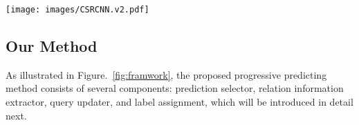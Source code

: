 \documentclass[final]{cvpr}
\begin{document}
\begin{figure*}[htbp]
  \centering
  \texttt{[image: images/CSRCNN.v2.pdf]}
\caption{The diagram of the proposed progressive end-to-end object detection framework. First, the \emph{prediction selector} select queries associated with high confidence scores as \emph{accepted queries}, leaving the rest as \emph{noisy queries}. Then \emph{Relation information extractor} models the relations between \emph{noisy queries} and their neighbors from accepted predictions. Next, the queries are fed into the \emph{queries updater} to be further refined by performing a new local self-attention.}
\label{fig:framwork}
\vspace{-1.5pc}
\end{figure*}

\subsection{Our Method}
\label{sec:approach_declearation}

As illustrated in Figure.~\ref{fig:framwork}, the proposed progressive predicting method consists of several components: prediction selector, relation information extractor, query updater, and label assignment, which will be introduced in detail next.
\end{document}

